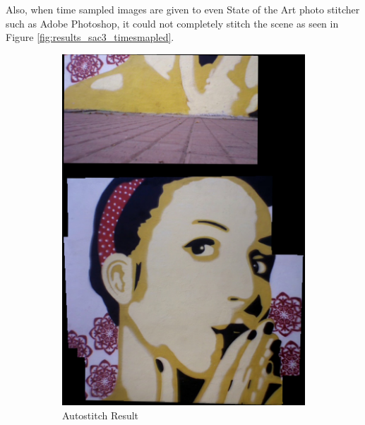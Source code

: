 Also, when time sampled images are given to even State of the Art photo stitcher
such as Adobe Photoshop, it could not completely stitch the scene as seen in
Figure \ref{fig:results_sac3_timesmapled}.

\begin{figure}[t!]
\centering
\begin{subfigure}[b]{0.4\textwidth}
\centering
\includegraphics[width=\linewidth]{figures/sac3/uniform_sampled/autostitch.jpg}
\caption{Autostitch Result}
\end{subfigure}
\begin{subfigure}[b]{0.4\textwidth}
\centering

\end{subfigure}
\end{figure}
